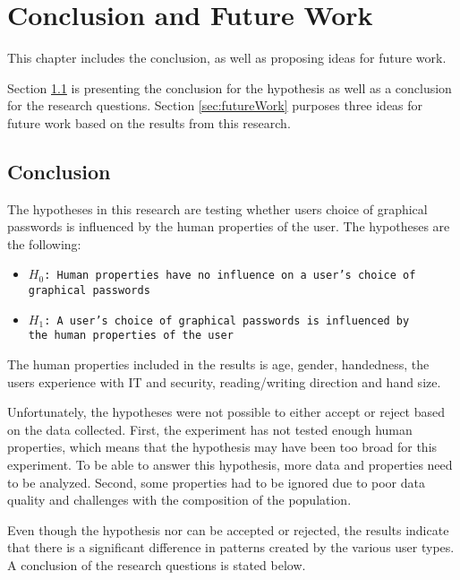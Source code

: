 \chapter{Conclusion and Future Work}\label{chap:conclusion}
  
  This chapter includes the conclusion, as well as proposing ideas for future work. 

  Section \ref{sec:conclusion} is presenting the conclusion for the hypothesis as well as a conclusion for the research questions. Section \ref{sec:futureWork} purposes three ideas for future work based on the results from this research. 

  \clearpage
  \section{Conclusion}\label{sec:conclusion}
    

The hypotheses in this research are testing whether users choice of graphical passwords is influenced by the human properties of the user. The hypotheses are the following:

    {\renewcommand\labelitemi{}
          \begin{itemize}
            \item \texttt{$H_{0}$: Human properties have no influence on a user's choice of \\graphical passwords}
            \item \texttt{$H_{1}$: A user's choice of graphical passwords is influenced by \\the human properties of the user}
          \end{itemize}
        }

The human properties included in the results is age, gender, handedness, the users experience with IT and security, reading/writing direction and hand size. 

Unfortunately, the hypotheses were not possible to either accept or reject based on the data collected. First, the experiment has not tested enough human properties, which means that the hypothesis may have been too broad for this experiment. To be able to answer this hypothesis, more data and properties need to be analyzed. Second, some properties had to be ignored due to poor data quality and challenges with the composition of the population.

Even though the hypothesis nor can be accepted or rejected, the results indicate that there is a significant difference in patterns created by the various user types. A conclusion of the research questions is stated below. 

